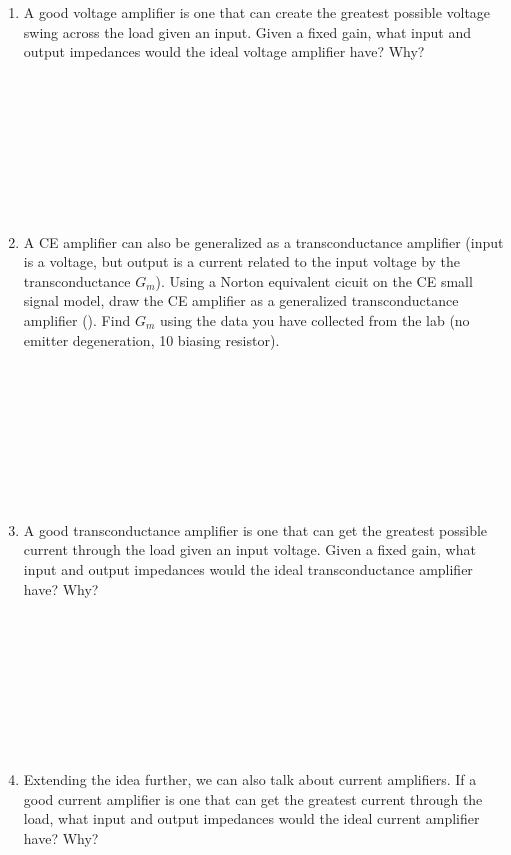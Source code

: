 \documentclass{article}
\begin{document}
\begin{enumerate}
\item A good voltage amplifier is one that can create the greatest possible voltage swing across the load given an input. Given a fixed gain, what input and output impedances would the ideal voltage amplifier have? Why?
\\~\\~\\~\\~\\~\\~\\~\\~\\

\item A CE amplifier can also be generalized as a transconductance amplifier (input is a voltage, but output is a current related to the input voltage by the transconductance $G_m$). Using a Norton equivalent cicuit on the CE small signal model, draw the CE amplifier as a generalized transconductance amplifier (). Find $G_m$ using the data you have collected from the lab (no emitter degeneration, \unit{10}{\kilo\ohm} biasing resistor).
\\~\\~\\~\\~\\~\\~\\~\\~\\
\item A good transconductance amplifier is one that can get the greatest possible current through the load given an input voltage. Given a fixed gain, what input and output impedances would the ideal transconductance amplifier have? Why?
\\~\\~\\~\\~\\~\\~\\~\\~\\
\item Extending the idea further, we can also talk about current amplifiers. If a good current amplifier is one that can get the greatest current through the load, what input and output impedances would the ideal current amplifier have? Why?

\end{enumerate}
\end{document}
